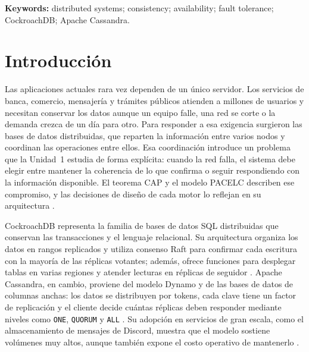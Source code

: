 \documentclass[11pt,a4paper]{article}
\newcommand{\sistemaA}{CockroachDB}      %
\newcommand{\sistemaB}{Apache Cassandra} %
\begin{document}
\vspace{0.4cm}
\noindent\textbf{Keywords:} distributed systems; consistency; availability; fault
tolerance; \sistemaA{}; \sistemaB{}.
\vspace*{\fill}
\clearpage

\section{Introducción}
Las aplicaciones actuales rara vez dependen de un único servidor. Los servicios de
banca, comercio, mensajería y trámites públicos atienden a millones de usuarios y
necesitan conservar los datos aunque un equipo falle, una red se corte o la demanda
crezca de un día para otro. Para responder a esa exigencia surgieron las bases de
datos distribuidas, que reparten la información entre varios nodos y coordinan las
operaciones entre ellos. Esa coordinación introduce un problema que la Unidad~1
estudia de forma explícita: cuando la red falla, el sistema debe elegir entre
mantener la coherencia de lo que confirma o seguir respondiendo con la información
disponible. El teorema CAP y el modelo PACELC describen ese compromiso, y las
decisiones de diseño de cada motor lo reflejan en su arquitectura
\cite{cockroachlabsReplication,apacheCassandraDynamo}.

\sistemaA{} representa la familia de bases de datos SQL distribuidas que conservan
las transacciones y el lenguaje relacional. Su arquitectura organiza los datos en
rangos replicados y utiliza consenso Raft para confirmar cada escritura con la
mayoría de las réplicas votantes; además, ofrece funciones para desplegar tablas en
varias regiones y atender lecturas en réplicas de seguidor
\cite{cockroachlabsArchitecture,vanbenschoten2022multiregion}. \sistemaB{}, en
cambio, proviene del modelo Dynamo y de las bases de datos de columnas anchas: los
datos se distribuyen por tokens, cada clave tiene un factor de replicación y el
cliente decide cuántas réplicas deben responder mediante niveles como \texttt{ONE},
\texttt{QUORUM} y \texttt{ALL} \cite{apacheCassandraDynamo}. Su adopción en
servicios de gran escala, como el almacenamiento de mensajes de Discord, muestra que
el modelo sostiene volúmenes muy altos, aunque también expone el costo operativo de
mantenerlo \cite{discord2023cassandra}.
\end{document}
